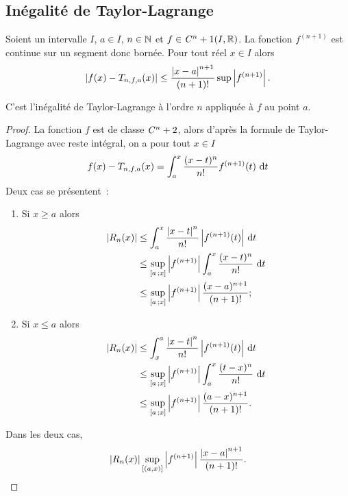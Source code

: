 \subsection{Inégalité de Taylor-Lagrange}

\begin{theo}
  Soient un intervalle $I$, $a \in I$, $n \in \mathbb{N}$ et $f \in \mathit{C}^n+1(I,\mathbb{R})$. La fonction $f^{(n+1)}$ est continue sur un segment donc bornée. Pour tout réel $x \in I$ alors
  \begin{equation}
    \left\lvert f(x)-T_{n,f,a}(x)\right\rvert \leq \frac{\left\lvert x-a\right\rvert^{n+1}}{(n+1)!} \sup \left\lvert f^{(n+1)}\right\rvert.
  \end{equation}

C'est l'inégalité de Taylor-Lagrange à l'ordre $n$ appliquée à $f$ au point $a$.
\end{theo}
\begin{proof}
  La fonction $f$ est de classe $\mathit{C}^n+2$, alors d'après la formule de Taylor-Lagrange avec reste intégral, on a pour tout $x \in I$
  \begin{equation}
    f(x)-T_{n,f,a}(x) = \int_a^x \frac{(x-t)^{n}}{n!} f^{(n+1)}(t)\,\mathop{}\mathopen{}\mathrm{d} t
  \end{equation}
  Deux cas se présentent~:
  \begin{enumerate}
  \item Si $x \geq a$ alors
    \begin{align}
      \left\lvert R_n(x)\right\rvert &\leq \int_a^x \frac{\left\lvert x-t\right\rvert^n}{n!}\left\lvert f^{(n+1)}(t)\right\rvert\,\mathop{}\mathopen{}\mathrm{d} t  \\
      &\leq \sup\limits_{\left[ a \, ;  x \right]}\left\lvert f^{(n+1)}\right\rvert \int_a^x \frac{(x-t)^n}{n!}\,\mathop{}\mathopen{}\mathrm{d} t\\
      &\leq \sup\limits_{\left[ a \, ;  x \right]}\left\lvert f^{(n+1)}\right\rvert \frac{(x-a)^{n+1}}{(n+1)!};
    \end{align}
  \item Si $x \leq a$ alors
    \begin{align}
      \left\lvert R_n(x)\right\rvert &\leq \int_x^a \frac{\left\lvert x-t\right\rvert^n}{n!}\left\lvert f^{(n+1)}(t)\right\rvert\,\mathop{}\mathopen{}\mathrm{d} t  \\
      &\leq \sup\limits_{\left[ a \, ;  x \right]}\left\lvert f^{(n+1)}\right\rvert \int_a^x \frac{(t-x)^n}{n!}\,\mathop{}\mathopen{}\mathrm{d} t\\
      &\leq \sup\limits_{\left[ a \, ;  x \right]}\left\lvert f^{(n+1)}\right\rvert \frac{(a-x)^{n+1}}{(n+1)!}.
    \end{align}
  \end{enumerate}
  Dans les deux cas,
  \begin{equation}
    \left\lvert R_n(x)\right\rvert \sup\limits_{[(a,x)]}\left\lvert f^{(n+1)}\right\rvert \frac{\left\lvert x-a\right\rvert^{n+1}}{(n+1)!}.
  \end{equation}
\end{proof}

